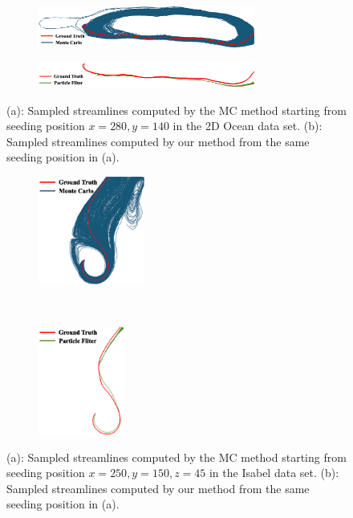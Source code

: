 \begin{figure}[!htb]
  \centering
  \begin{subfigure}[!htb]{0.5\textwidth}
    \centering
    \includegraphics[width=2.8in]{../figures/ocean_mc1.eps}
    \caption{}
    \label{case_5_a}
  \end{subfigure}

  \begin{subfigure}[!htb]{0.5\textwidth}
    \centering
    \includegraphics[width=2.8in]{../figures/ocean_smc1.eps}
    \caption{}
    \label{case_5_b}
  \end{subfigure}
  \caption{(a): Sampled streamlines computed by the MC method starting from seeding position $x=280, y=140$ in the 2D Ocean data set. (b): Sampled streamlines computed by our method from the same seeding position in (a).}
  \label{case_5}
\end{figure}

\begin{figure}[!htb]
  \centering
  \begin{subfigure}[!htb]{0.25\textwidth}
    \centering
    \includegraphics[height=1.4in]{../figures/isabel_mc1.eps}
    \caption{}
    \label{case_4_a}
  \end{subfigure}~
  \begin{subfigure}[!htb]{0.25\textwidth}
    \centering
    \includegraphics[height=1.4in]{../figures/isabel_smc1.eps}
    \caption{}
    \label{case_4_b}
  \end{subfigure}
  \caption{(a): Sampled streamlines computed by the MC method starting from seeding position $x=250, y=150, z=45$ in the Isabel data set. (b): Sampled streamlines computed by our method from the same seeding position in (a).}
  \label{case_4}
\end{figure}

